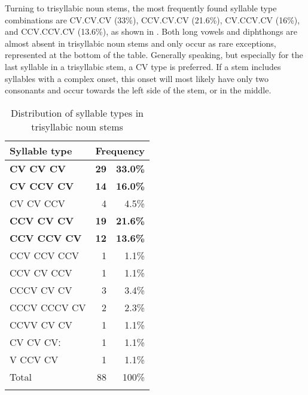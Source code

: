 
		
	


Turning to trisyllabic noun stems, the most frequently found syllable type combinations are CV.CV.CV (33\%), CCV.CV.CV (21.6\%), CV.CCV.CV (16\%), and CCV.CCV.CV (13.6\%), as shown in . Both long vowels and diphthongs are almost absent in trisyllabic noun stems and only occur as rare exceptions, represented at the bottom of the table. Generally speaking, but especially for the last syllable in a trisyllabic stem, a CV type is preferred. If a stem includes syllables with a complex onset, this onset will most likely have only two consonants and occur towards the left side of the stem, or in the middle.
 
 \begin{table}
\begin{tabular}{lrr}
\lsptoprule
Syllable type & \multicolumn{2}{c}{Frequency} \\  \midrule
{\bfseries CV CV CV}		& {\bfseries 29} &  {\bfseries 33.0\%} \\
{\bfseries CV CCV CV}	    & {\bfseries 14} & {\bfseries 16.0\%} \\
CV CV CCV	                & 	4  & 4.5\% \\
\midrule
{\bfseries CCV CV CV}	& 	{\bfseries 19} & {\bfseries 21.6\%} \\
{\bfseries CCV CCV CV}	& 	{\bfseries 12} & {\bfseries 13.6\%} \\
CCV CCV CCV	& 	1 & 1.1\% \\
CCV CV CCV	& 	1  & 1.1\% \\
\midrule
CCCV CV CV	& 	3  & 3.4\% \\
CCCV CCCV CV & 	2  & 2.3\% \\
\midrule
CCVV CV CV	& 	1 & 1.1\% \\
CV CV CVː	& 	1  & 1.1\% \\
V CCV CV		& 	1  & 1.1\% \\
 \midrule
Total 			& 	88  & 100\% \\
\lspbottomrule
\end{tabular}
\caption{Distribution of syllable types in trisyllabic noun stems}
\label{Tab:o3Syll}
\end{table}

